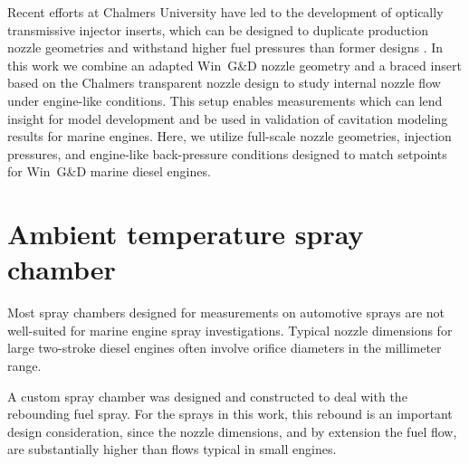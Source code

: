 \documentclass[letterpaper,twocolumn,10pt]{ilass}
\begin{document}
Recent efforts at Chalmers University have led to the development of optically
transmissive injector inserts, which can be designed to duplicate production nozzle geometries
and withstand higher fuel pressures than former designs \cite{Falgout2015}.
In this work we combine an adapted Win~G\&D nozzle geometry and a braced insert based on
the Chalmers transparent nozzle design to study internal nozzle flow under engine-like
conditions. This setup enables measurements which can lend insight for model development
and be used in validation of cavitation modeling results for marine engines.
%
Here, we utilize full-scale nozzle geometries, injection pressures, and engine-like
back-pressure conditions designed to match setpoints for Win~G\&D marine diesel engines. 

\section*{Ambient temperature spray chamber}
Most spray chambers designed for measurements on automotive sprays are not well-suited for
marine engine spray investigations.
Typical nozzle dimensions for large two-stroke diesel engines often involve orifice diameters in the millimeter range.
%

A custom spray chamber was designed and constructed to deal with the rebounding fuel spray.
For the sprays in this work, this rebound is an important design consideration, since the nozzle dimensions, and by extension the fuel flow, are substantially higher than flows typical in small engines. 
\end{document}
